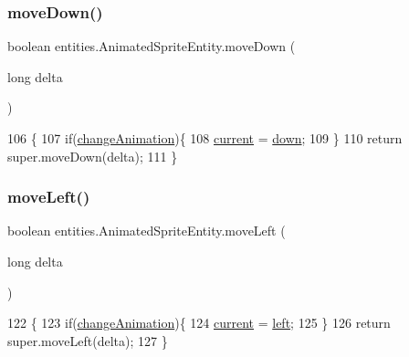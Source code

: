 \subsubsection{\texorpdfstring{move\+Down()}{moveDown()}}
{\footnotesize\ttfamily boolean entities.\+Animated\+Sprite\+Entity.\+move\+Down (\begin{DoxyParamCaption}\item[{long}]{delta }\end{DoxyParamCaption})\hspace{0.3cm}{\ttfamily [inline]}}


\begin{DoxyCode}
106                                         \{
107         \textcolor{keywordflow}{if}(\mbox{\hyperlink{classentities_1_1_animated_sprite_entity_ac5b06797e6a716cb04b883d92301fabf}{changeAnimation}})\{
108             \mbox{\hyperlink{classentities_1_1_animated_sprite_entity_ab44999a4be67c7ce81f4da6b5d333ce5}{current}} = \mbox{\hyperlink{classentities_1_1_animated_sprite_entity_a770f7c34cd976991f59b6701d670d974}{down}};
109         \}
110         \textcolor{keywordflow}{return} super.moveDown(delta);
111     \}
\end{DoxyCode}
\mbox{\label{classentities_1_1_animated_sprite_entity_a3a0ea9690a4518899e74d92882952c8c}} 
\subsubsection{\texorpdfstring{move\+Left()}{moveLeft()}}
{\footnotesize\ttfamily boolean entities.\+Animated\+Sprite\+Entity.\+move\+Left (\begin{DoxyParamCaption}\item[{long}]{delta }\end{DoxyParamCaption})\hspace{0.3cm}{\ttfamily [inline]}}


\begin{DoxyCode}
122                                         \{
123         \textcolor{keywordflow}{if}(\mbox{\hyperlink{classentities_1_1_animated_sprite_entity_ac5b06797e6a716cb04b883d92301fabf}{changeAnimation}})\{
124             \mbox{\hyperlink{classentities_1_1_animated_sprite_entity_ab44999a4be67c7ce81f4da6b5d333ce5}{current}} = \mbox{\hyperlink{classentities_1_1_animated_sprite_entity_ae706cd48f3aeb5cac587490c5317553d}{left}};
125         \}
126         \textcolor{keywordflow}{return} super.moveLeft(delta);
127     \}
\end{DoxyCode}
\mbox{\label{classentities_1_1_animated_sprite_entity_a2c5313110fec88112214016c9e5435a7}} 
